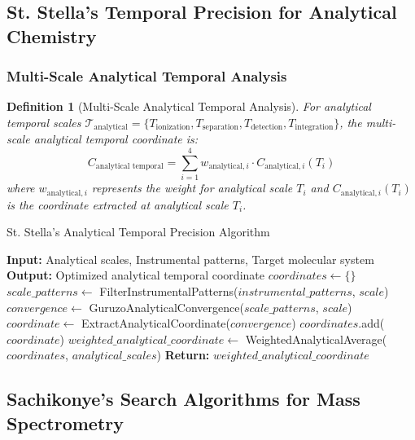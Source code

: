 \documentclass[11pt,a4paper]{article}
\newtheorem{definition}[theorem]{Definition}
\theoremstyle{remark}
\begin{document}
{{{{{{{{{{\subsection{St. Stella's Temporal Precision for Analytical Chemistry}

\subsubsection{Multi-Scale Analytical Temporal Analysis}

\begin{definition}[Multi-Scale Analytical Temporal Analysis]
For analytical temporal scales $\mathcal{T}_{\text{analytical}} = \{T_{\text{ionization}}, T_{\text{separation}}, T_{\text{detection}}, T_{\text{integration}}\}$, the multi-scale analytical temporal coordinate is:
\begin{equation}
C_{\text{analytical temporal}} = \sum_{i=1}^{4} w_{\text{analytical},i} \cdot C_{\text{analytical},i}(T_i)
\end{equation}
where $w_{\text{analytical},i}$ represents the weight for analytical scale $T_i$ and $C_{\text{analytical},i}(T_i)$ is the coordinate extracted at analytical scale $T_i$.
\end{definition}

\begin{algorithm}[H]
\caption{St. Stella's Analytical Temporal Precision Algorithm}
\begin{algorithmic}[1]
\State \textbf{Input:} Analytical scales, Instrumental patterns, Target molecular system
\State \textbf{Output:} Optimized analytical temporal coordinate
    \State $coordinates \gets \{\}$
        \State $scale\_patterns \gets$ FilterInstrumentalPatterns($instrumental\_patterns$, $scale$)
        \State $convergence \gets$ GuruzoAnalyticalConvergence($scale\_patterns$, $scale$)
        \State $coordinate \gets$ ExtractAnalyticalCoordinate($convergence$)
        \State $coordinates$.add($coordinate$)
    \EndFor
    \State $weighted\_analytical\_coordinate \gets$ WeightedAnalyticalAverage($coordinates$, $analytical\_scales$)
    \State \textbf{Return:} $weighted\_analytical\_coordinate$
\EndProcedure
\end{algorithmic}
\end{algorithm}

\subsection{Sachikonye's Search Algorithms for Mass Spectrometry}

}}}}}}}}}}
\end{document}
